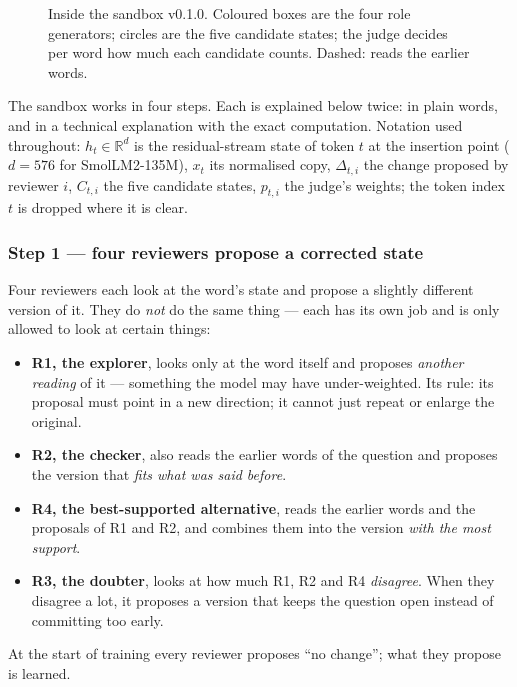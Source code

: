 \documentclass[a4paper,12pt,parskip=half,headsepline]{scrartcl}
\begin{document}
\begin{figure}[H]
{}
\caption{Inside the sandbox v0.1.0. Coloured boxes are the four role generators; circles are the five candidate states; the judge decides per word how much each candidate counts. Dashed: reads the earlier words.}
\label{fig:inside}
\end{figure}

The sandbox works in four steps. Each is explained below twice: in plain words, and
in a technical explanation with the exact computation. Notation used throughout:
$h_t \in \mathbb{R}^{d}$ is the residual-stream state of token $t$ at the insertion
point ($d = 576$ for SmolLM2-135M), $x_t$ its normalised copy, $\Delta_{t,i}$ the change
proposed by reviewer $i$, $C_{t,i}$ the five candidate states, $p_{t,i}$ the judge's
weights; the token index $t$ is dropped where it is clear.

\subsubsection*{Step 1 --- four reviewers propose a corrected state}
\label{sec:roles}

\begin{plain}
Four reviewers each look at the word's state and propose a slightly different
version of it. They do \emph{not} do the same thing --- each has its own job and is
only allowed to look at certain things:
\begin{itemize}
\item \textbf{R1, the explorer}, looks only at the word itself and proposes \emph{another
reading} of it --- something the model may have under-weighted. Its rule: its
proposal must point in a new direction; it cannot just repeat or enlarge the original.
\item \textbf{R2, the checker}, also reads the earlier words of the question and
proposes the version that \emph{fits what was said before}.
\item \textbf{R4, the best-supported alternative}, reads the earlier words and the
proposals of R1 and R2, and combines them into the version \emph{with the most support}.
\item \textbf{R3, the doubter}, looks at how much R1, R2 and R4 \emph{disagree}. When
they disagree a lot, it proposes a version that keeps the question open instead of
committing too early.
\end{itemize}
At the start of training every reviewer proposes ``no change''; what they propose is
learned.
\end{plain}
\end{document}

